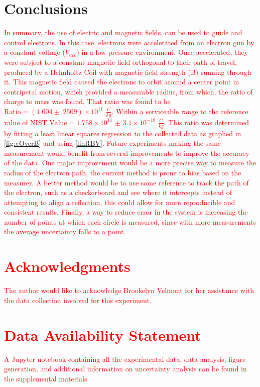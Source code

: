 \documentclass[%
 reprint,
 amsmath,amssymb,
 aps,
]{revtex4-2}
\begin{document}
\section{Conclusions}
\textcolor{red}{In summary, the use of electric and magnetic fields, can be used to guide and control electrons. In this case, electrons were accelerated from an electron gun by a constant voltage ($V_{acc}$) in a low pressure environment. Once accelerated, they were subject to a constant magnetic field orthogonal to their path of travel, produced by a Helmholtz Coil with magnetic field strength (B) running through it. This magnetic field caused the electrons to orbit around a center point in centripetal motion, which provided a measurable radius, from which, the ratio of charge to mass was found. That ratio was found to be $\text{Ratio} = ( 1.004 \pm .2509 )\times 10^{11}$ $\frac{C}{kg}$. Within a serviceable range to the reference value of $\text{NIST Value} = 1.758 \times 10^{11}$  $\pm$ $3.1 \times 10^{-10}$  $\frac{C}{kg}$. This ratio was determined by fitting a least linear squares regression to the collected data as graphed in \ref{fig:vOverB} and using \eqref{linRBV}. Future experiments making the same measurement would benefit from several improvements to improve the accuracy of the data. One major improvement would be a more precise way to measure the radius of the electron path, the current method is prone to bias based on the measurer. A better method would be to use some reference to track the path of the electron, such as a checkerboard and see where it intercepts instead of attempting to align a reflection, this could allow for more reproducible and consistent results. Finally, a way to reduce error in the system is increasing the number of points at which each circle is measured, since with more measurements the average uncertainty falls to a point.}

\section*{\textcolor{red}{Acknowledgments}}
\textcolor{red}{The author would like to acknowledge Brookelyn Velmont for her assistance with the data collection involved for this experiment.}

\section*{\textcolor{red}{Data Availability Statement}}
\textcolor{red}{A Jupyter notebook containing all the experimental data, data analysis, figure generation, and additional information on uncertainty analysis can be found in the supplemental materials. \cite{supp}}


\end{document}
